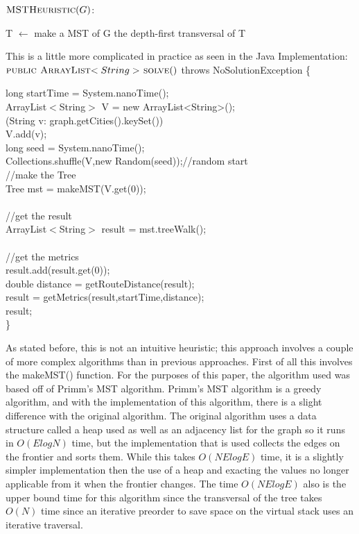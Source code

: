 \documentclass[midd]{thesis}
\newcommand{\tab}{\hspace*{2em}}
\begin{document}
$\textnormal{\scshape MSTHeuristic}(G)$:
\begin{codebox}
\li T $\gets$ make a MST of G
\li \Return the depth-first transversal of T
\end{codebox}
This is a little more complicated in practice as seen in the Java Implementation:\\
$\textnormal{\scshape public ArrayList$<String>$ solve}()$ throws NoSolutionException \{
\begin{codebox}
\tab long startTime = System.nanoTime();\\
\tab ArrayList$<$String$>$ V = new ArrayList<String>();\\
\tab \For(String v: graph.getCities().keySet())\\
\tab\tab V.add(v);\End\\
\tab long seed = System.nanoTime();\\
\tab Collections.shuffle(V,new Random(seed));//random start\\
\tab//make the Tree\\
\tab Tree mst = makeMST(V.get(0));\\\\
\tab//get the result\\
\tab ArrayList$<$String$>$ result = mst.treeWalk();\\\\	
\tab//get the metrics\\
\tab result.add(result.get(0));\\
\tab double distance = getRouteDistance(result);\\
\tab result = getMetrics(result,startTime,distance);\\
\Return result;\\
\}
\end{codebox}
\tab As stated before, this is not an intuitive heuristic; this approach involves a couple of more complex algorithms than in previous approaches. First of all this involves the makeMST() function. For the purposes of this paper, the algorithm used was based off of Primm's MST algorithm. Primm's MST algorithm is a greedy algorithm, and with the implementation of this algorithm, there is a slight difference with the original algorithm. The original algorithm uses a data structure called a heap used as well as an adjacency list for the graph so it runs in $O(ElogN)$ time, but the implementation that is used collects the edges on the frontier and sorts them. While this takes $O(NElogE)$ time, it is a slightly simpler implementation then the use of a heap and exacting the values no longer applicable from it when the frontier changes. The time $O(NElogE)$ also is the upper bound time for this algorithm since the transversal of the tree takes $O(N)$ time since an iterative preorder to save space on the virtual stack uses an iterative traversal.\\
\end{document}
